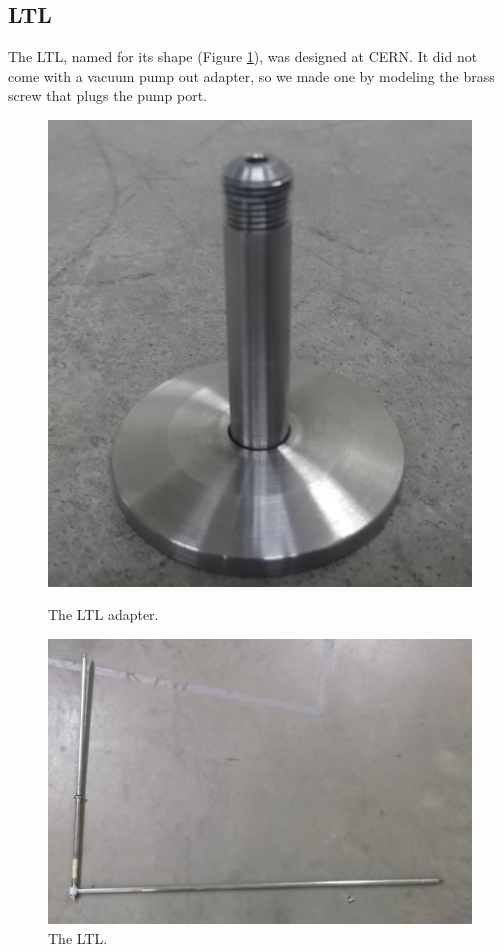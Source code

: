 \subsection{LTL}

The LTL, named for its shape (Figure \ref{fig:ltl}), was designed at CERN.  It did not come with a vacuum pump out adapter, so we made one by modeling the brass screw that plugs the pump port.

\begin{figure}
\begin{minipage}{.45\linewidth}
 \centering
 \includegraphics[width=\linewidth]{img/ltl-adapter.jpg}
 \caption{The LTL adapter.}
 \label{fig:ltl-adapter}
\end{minipage}
\quad
\begin{minipage}{.45\linewidth}
 \includegraphics[width=\linewidth]{img/ltl.jpg}
 \caption{The LTL.}
 \label{fig:ltl}
\end{minipage}
\end{figure}

